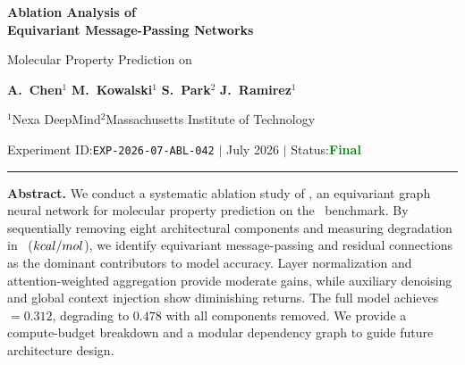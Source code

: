 \documentclass[11pt,a4paper]{article}
\begin{document}
\begin{center}
  {\Huge\bfseries\color{slate}Ablation Analysis of\\[1pt]Equivariant Message-Passing Networks}

  \vspace{6pt}
  {\Large\color{slatelight}Molecular Property Prediction on \dataset}

  \vspace{10pt}
  {\normalsize\color{slate}
    \textbf{A.\ Chen}$^{1}$\hspace{6pt}
    \textbf{M.\ Kowalski}$^{1}$\hspace{6pt}
    \textbf{S.\ Park}$^{2}$\hspace{6pt}
    \textbf{J.\ Ramirez}$^{1}$
  }

  \vspace{3pt}
  {\footnotesize\color{slatelight}
    $^{1}$Nexa DeepMind\hspace{14pt}$^{2}$Massachusetts Institute of Technology
  }

  \vspace{6pt}
  {\footnotesize\color{slatelight}
    Experiment ID:\;\texttt{EXP-2026-07-ABL-042}
    \quad\(\mid\)\quad
    July 2026
    \quad\(\mid\)\quad
    Status:\;\textcolor{green}{\textbf{Final}}
  }

  \vspace{6pt}
  {\color{accent!35}\rule{\textwidth}{0.8pt}}
\end{center}

\vspace{4pt}

{\bfseries\color{accent}Abstract.}\;
We conduct a systematic ablation study of \modelname, an equivariant graph neural network
for molecular property prediction on the \dataset\ benchmark. By sequentially removing
eight architectural components and measuring degradation in \metric\ (\(kcal/mol\)),
we identify equivariant message-passing and residual connections as the dominant
contributors to model accuracy. Layer normalization and attention-weighted aggregation
provide moderate gains, while auxiliary denoising and global context injection show
diminishing returns. The full model achieves \metric\ \(= 0.312\), degrading to
\(0.478\) with all components removed. We provide a compute-budget breakdown and a
modular dependency graph to guide future architecture design.

\vspace{8pt}









\end{document}
